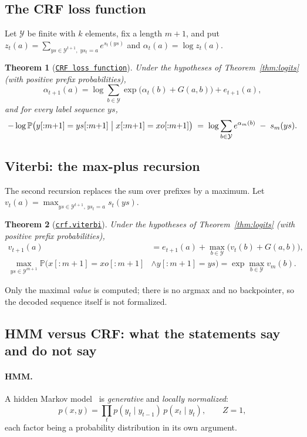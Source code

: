 \documentclass[11pt,a4paper]{article}
\newcommand{\lmod}[2]{\href{http://www.lemma.cn/lean/?module=#2}{\nolinkurl{#1}}}
\newtheorem{theorem}{Theorem}[section]
\newcommand{\Prb}{\mathbb{P}}
\newcommand{\Y}{\mathcal{Y}}
\begin{document}
\subsection{The CRF loss function}
\label{sec:forward}
Let $\Y$ be finite with $k$ elements, fix a length $m+1$, and put $z_t(a)=\sum_{ys\in\Y^{t+1},\;ys_t=a}e^{s_t(ys)}$ and $\alpha_t(a)=\log z_t(a)$.

\begin{theorem}[\lmod{CRF loss function}{Random.All_Eq_AddLogSumExpAdd.All_EqNegLogProb.of.All_Eq_LogProbCond.All_Eq_LogProbCond.Eq_LogProbJoint.All_Lt0ProbJoint.IsDiscreteHMM}]
\label{thm:nll}
Under the hypotheses of Theorem~\ref{thm:logits} (with positive prefix probabilities),
\[
\alpha_{t+1}(a)=\log\sum_{b\in\Y}\exp\bigl(\alpha_t(b)+G(a,b)\bigr)+e_{t+1}(a),
\]
and for every label sequence $ys$,
\[
-\log\Prb\bigl(y[{:}m{+}1]=ys[{:}m{+}1]\bigm|x[{:}m{+}1]=xo[{:}m{+}1]\bigr)\;=\;\log\sum_{b\in\Y}e^{\alpha_m(b)}\;-\;s_m(ys).
\]
\end{theorem}

\subsection{Viterbi: the max-plus recursion}
\label{sec:viterbi}
The second recursion replaces the sum over prefixes by a maximum.
Let $v_t(a)=\max_{ys\in\Y^{t+1},\,ys_t=a}s_t(ys)$.

\begin{theorem}[\lmod{crf.viterbi}{Random.All_Eq_Add_MaxAdd.EqMax_ProbJoint.of.All_Eq_LogProbCond.All_Eq_LogProbCond.Eq_LogProbJoint.All_Lt0ProbJoint.IsDiscreteHMM}]
\label{thm:viterbi}
Under the hypotheses of Theorem~\ref{thm:logits} (with positive prefix probabilities),
\begin{align*}
v_{t+1}(a)&=e_{t+1}(a)+\max_{b\in\Y}\bigl(v_t(b)+G(a,b)\bigr),\\
\max_{ys\in\Y^{m+1}}\Prb\bigl(x[{:}m{+}1]=xo[{:}m{+}1]&\wedge y[{:}m{+}1]=ys\bigr)=\exp\max_{b\in\Y}v_m(b).
\end{align*}
\end{theorem}
Only the maximal \emph{value} is computed; there is no argmax and no backpointer, so the decoded sequence itself is not formalized.


\subsection{HMM versus CRF: what the statements say and do not say}
\label{sec:hmmcrf}
\paragraph{HMM.}
A hidden Markov model~\cite{rabiner1989hmm} is \emph{generative} and \emph{locally normalized}:
\[
p(x,y)=\prod_{t}p(y_t\mid y_{t-1})\,p(x_t\mid y_t),\qquad Z=1,
\]
each factor being a probability distribution in its own argument.
\end{document}
